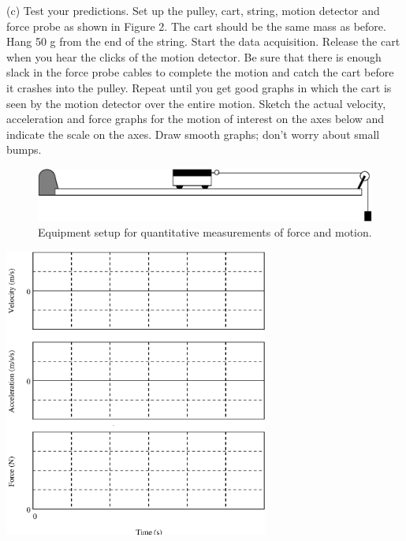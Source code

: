 \newpage

(c) Test your predictions. Set up the pulley, cart, string, motion detector
and force probe as shown in Figure 2. The cart should be the same mass as before. Hang 50 g from the end of the string. Start the data acquisition.
Release the cart when you hear the clicks of the motion detector. Be sure that
there is enough slack in the force probe cables to complete the motion and catch
the cart before it crashes into the pulley. Repeat until you get good graphs
in which the cart is seen by the motion detector over the entire motion. Sketch
the actual velocity, acceleration and force graphs for the motion of interest
on the axes below and indicate the scale on the axes. Draw smooth graphs; don't
worry about small bumps.

\begin{figure}
{\par\centering \includegraphics{force1/force1_fig4.eps} \par}


\caption{Equipment setup for quantitative measurements of force and motion.}
\end{figure}


\vspace{0.3cm}
{\par\centering \includegraphics[width=0.65\textwidth]{force1/force1_fig5.eps} \par}
\vspace{0.3cm}

